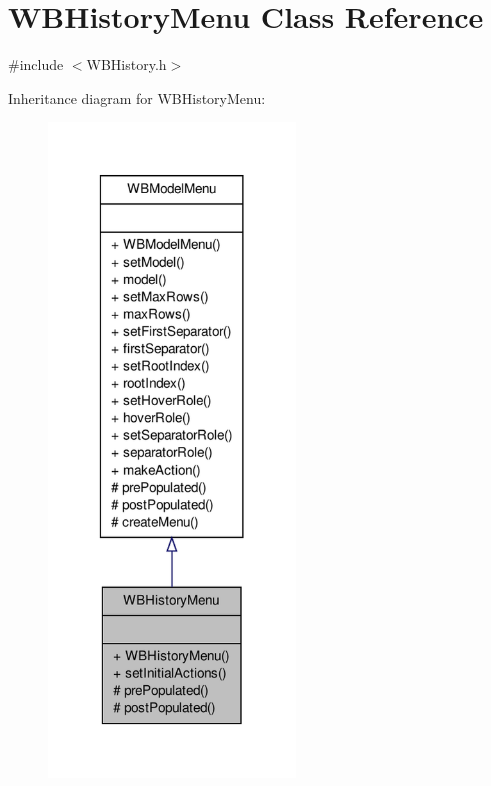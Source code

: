\hypertarget{class_w_b_history_menu}{\section{W\-B\-History\-Menu Class Reference}
\label{d2/d4c/class_w_b_history_menu}
}


{\ttfamily \#include $<$W\-B\-History.\-h$>$}



Inheritance diagram for W\-B\-History\-Menu\-:
\nopagebreak
\begin{figure}[H]
\begin{center}
\leavevmode
\includegraphics[width=186pt]{d0/deb/class_w_b_history_menu__inherit__graph}
\end{center}
\end{figure}


